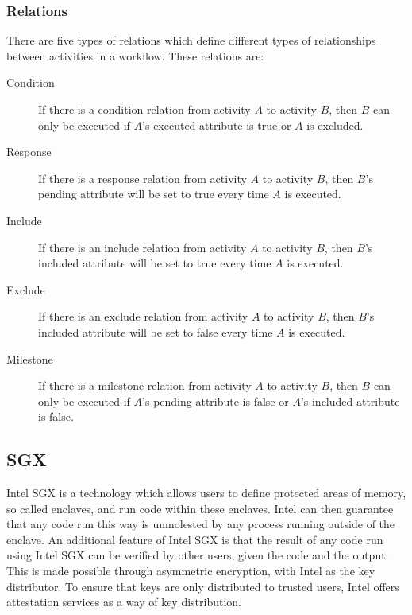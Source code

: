 \documentclass{article}
\begin{document}
		\subsubsection{Relations}

		There are five types of relations which define different types of relationships between activities in a workflow. 
		These relations are:

		\begin{description}
			\item[Condition] If there is a condition relation from activity $A$ to activity $B$, then $B$ can only be executed if $A$'s executed attribute is true or $A$ is excluded.
			\item[Response] If there is a response relation from activity $A$ to activity $B$, then $B$'s pending attribute will be set to true every time $A$ is executed.
			\item[Include] If there is an include relation from activity $A$ to activity $B$, then $B$'s included attribute will be set to true every time $A$ is executed.
			\item[Exclude] If there is an exclude relation from activity $A$ to activity $B$, then $B$'s included attribute will be set to false every time $A$ is executed.
			\item[Milestone] If there is a milestone relation from activity $A$ to activity $B$, then $B$ can only be executed if $A$'s pending attribute is false or $A$'s included attribute is false.
		\end{description}

		\subsection{SGX}

		Intel SGX is a technology which allows users to define protected areas of memory, so called enclaves, and run code within these enclaves.
		Intel can then guarantee that any code run this way is unmolested by any process running outside of the enclave.
		An additional feature of Intel SGX is that the result of any code run using Intel SGX can be verified by other users, given the code and the output.
		This is made possible through asymmetric encryption, with Intel as the key distributor.
		To ensure that keys are only distributed to trusted users, Intel offers attestation services as a way of key distribution.
\end{document}
